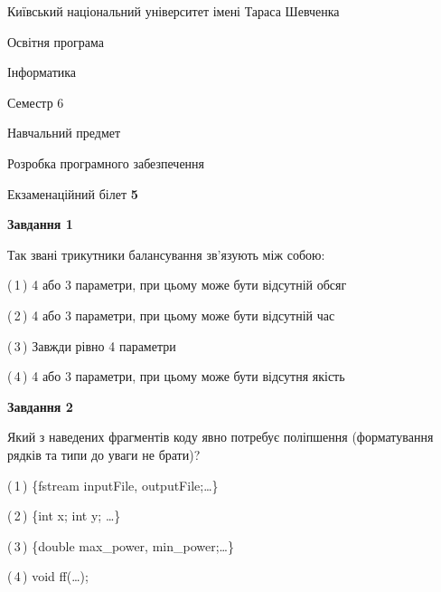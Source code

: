 \documentclass[10pt, ukrainian]{article}
\begin{document}
{{\begin {small}\par
{ \center  Київський національний університет імені Тараса Шевченка \par}
{\parbox {5 cm}{Освітня програма \hfill}{\parbox {7 cm}{Інформатика \hfill}}\parbox {6 cm}{\hfill Семестр 6}}\par
{\parbox {5 cm} {Навчальний предмет \hfill}\parbox {7 cm}{Розробка програмного забезпечення \hfill}\parbox {6cm}{\hfill}\par}\vspace{-7pt} \end{small}}{\center Екзаменаційний білет \No \textbf
{ 5 }\par}}
{
\begin {large}
{\begin {center}\textbf{Завдання 1}\end {center}}\par
Так звані трикутники балансування зв'язують між собою:\par
\vspace{2mm}



(\,1\,) 4 або 3 параметри, при цьому може бути відсутній обсяг %



(\,2\,) 4 або 3 параметри, при цьому може бути відсутній час%



(\,3\,) Завжди рівно 4 параметри%



(\,4\,) 4 або 3 параметри, при цьому може бути відсутня якість%


{\begin {center}\textbf{Завдання 2}\end {center}}\par
Який з наведених фрагментів коду явно потребує поліпшення (форматування рядків та типи до уваги не брати)?\par
\vspace{2mm}



(\,1\,) \{fstream inputFile, outputFile;…\} %



(\,2\,) \{int x; int y; …\}%



(\,3\,) \{double max\_power, min\_power;…\} %



(\,4\,) void ff(…);%



\end{large}}
\end{document}
